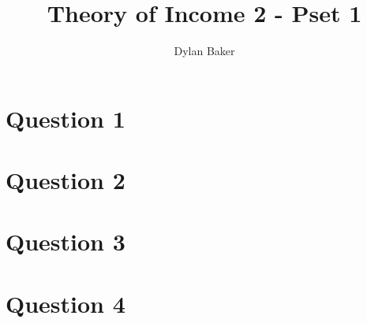 \documentclass[10pt]{article}
\title{Theory of Income 2 - Pset 1}
\author{Dylan Baker}
\date{}
\begin{document}
\maketitle

\tableofcontents

\section{Question 1}


\pagebreak

\section{Question 2}


\pagebreak

\section{Question 3}


\pagebreak

\section{Question 4}

\end{document}
